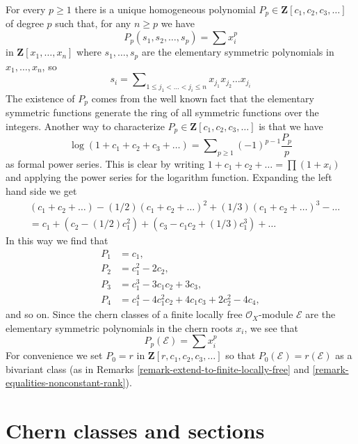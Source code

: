 \begin{example}
\label{example-power-sum}
For every $p \geq 1$ there is a unique homogeneous polynomial
$P_p \in \mathbf{Z}[c_1, c_2, c_3, \ldots]$ of degree $p$
such that, for any $n \geq p$ we have
$$
P_p(s_1, s_2, \ldots, s_p) = \sum x_i^p
$$
in $\mathbf{Z}[x_1, \ldots, x_n]$ where $s_1, \ldots, s_p$ are the
elementary symmetric polynomials in $x_1, \ldots, x_n$, so
$$
s_i = \sum\nolimits_{1 \leq j_1 < \ldots < j_i \leq n}
x_{j_1}x_{j_2} \ldots x_{j_i}
$$
The existence of $P_p$ comes from the well known fact that
the elementary symmetric functions generate the ring of
all symmetric functions over the integers. Another way to
characterize $P_p \in \mathbf{Z}[c_1, c_2, c_3, \ldots]$ is that we have
$$
\log(1 + c_1 + c_2 + c_3 + \ldots) =
\sum\nolimits_{p \geq 1} (-1)^{p - 1}\frac{P_p}{p}
$$
as formal power series. This is clear by writing
$1 + c_1 + c_2 + \ldots = \prod (1 + x_i)$ and applying
the power series for the logarithm function. Expanding the left
hand side we get
\begin{align*}
& (c_1 + c_2 + \ldots) - (1/2)(c_1 + c_2 + \ldots)^2 +
(1/3)(c_1 + c_2 + \ldots)^3 - \ldots \\
& =
c_1 + (c_2 - (1/2)c_1^2) + (c_3 - c_1c_2 + (1/3)c_1^3) + \ldots
\end{align*}
In this way we find that
\begin{align*}
P_1 & = c_1, \\
P_2 & = c_1^2 - 2c_2, \\
P_3 & = c_1^3 - 3c_1c_2 + 3c_3, \\
P_4 & = c_1^4 - 4c_1^2c_2 + 4c_1c_3 + 2c_2^2 - 4c_4,
\end{align*}
and so on. Since the chern classes of a finite locally free
$\mathcal{O}_X$-module $\mathcal{E}$ are the elementary symmetric
polynomials in the chern roots $x_i$, we see that
$$
P_p(\mathcal{E}) = \sum x_i^p
$$
For convenience we set $P_0 = r$ in $\mathbf{Z}[r, c_1, c_2, c_3, \ldots]$
so that $P_0(\mathcal{E}) = r(\mathcal{E})$ as a bivariant class
(as in Remarks \ref{remark-extend-to-finite-locally-free} and
\ref{remark-equalities-nonconstant-rank}).
\end{example}






\section{Chern classes and sections}
\label{section-top-chern-class}

